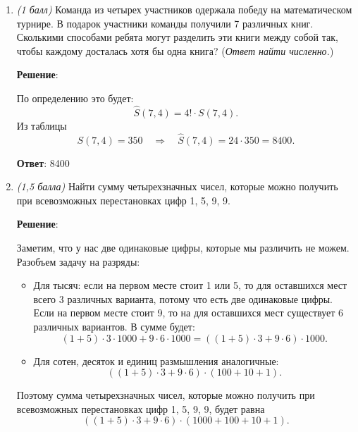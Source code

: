 \documentclass{article}
\begin{document}
\begin{enumerate}

    \item \textit{(1 балл)} Команда из четырех участников одержала победу на математическом турнире. В подарок участники команды получили 7 различных книг. Сколькими способами ребята могут разделить эти книги между собой так, чтобы каждому досталась хотя бы одна книга? (\textit{Ответ найти численно.})
    
    \textbf{Решение}:
    
    По определению это будет:
    \begin{equation}
        \widehat{S}(7,4) = 4! \cdot S(7,4).
    \end{equation}
    Из таблицы
    \begin{equation}
        S(7,4) = 350 \quad \Rightarrow \quad \widehat{S}(7,4) = 24 \cdot 350 = 8400.
    \end{equation}

    \textbf{Ответ}:
    8400

    \item \textit{(1,5 балла)} Найти сумму четырехзначных чисел, которые можно получить при всевозможных перестановках цифр 1, 5, 9, 9.

    \textbf{Решение}:

    Заметим, что у нас две одинаковые цифры, которые мы различить не можем. Разобъем задачу на разряды:
    \begin{itemize}
        \item Для тысяч: если на первом месте стоит 1 или 5, то для оставшихся мест всего 3 различных варианта, потому что есть две одинаковые цифры. Если на первом месте стоит 9, то на для оставшихся мест существует 6 различных вариантов. В сумме будет:
        \begin{equation}
            (1 + 5) \cdot 3 \cdot 1000 + 9 \cdot 6 \cdot 1000 = ((1 + 5) \cdot 3 + 9 \cdot 6) \cdot 1000.
        \end{equation}
        \item Для сотен, десяток и единиц размышления аналогичные:
        \begin{equation}
            ((1 + 5) \cdot 3 + 9 \cdot 6) \cdot (100 + 10 + 1).
        \end{equation}
    \end{itemize}
    Поэтому сумма четырехзначных чисел, которые можно получить при всевозможных перестановках цифр 1, 5, 9, 9, будет равна
    \begin{equation}
        ((1 + 5) \cdot 3 + 9 \cdot 6) \cdot (1000 + 100 + 10 + 1).
    \end{equation}
    

\end{enumerate}
\end{document}
